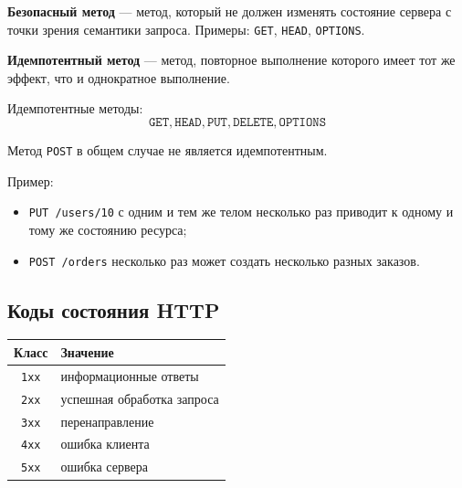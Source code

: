 \documentclass[12pt,a4paper]{article}
\begin{document}
\textbf{Безопасный метод} --- метод, который не должен изменять состояние сервера с точки зрения семантики запроса. Примеры: \texttt{GET}, \texttt{HEAD}, \texttt{OPTIONS}.

\textbf{Идемпотентный метод} --- метод, повторное выполнение которого имеет тот же эффект, что и однократное выполнение.

Идемпотентные методы:
\[
\texttt{GET}, \texttt{HEAD}, \texttt{PUT}, \texttt{DELETE}, \texttt{OPTIONS}
\]

Метод \texttt{POST} в общем случае не является идемпотентным.

Пример:
\begin{itemize}
    \item \texttt{PUT /users/10} с одним и тем же телом несколько раз приводит к одному и тому же состоянию ресурса;
    \item \texttt{POST /orders} несколько раз может создать несколько разных заказов.
\end{itemize}

\subsection{Коды состояния HTTP}

\begin{center}
\begin{tabular}{|c|p{9cm}|}
\hline
Класс & Значение \\
\hline
\texttt{1xx} & информационные ответы \\
\hline
\texttt{2xx} & успешная обработка запроса \\
\hline
\texttt{3xx} & перенаправление \\
\hline
\texttt{4xx} & ошибка клиента \\
\hline
\texttt{5xx} & ошибка сервера \\
\hline
\end{tabular}
\end{center}
\end{document}

